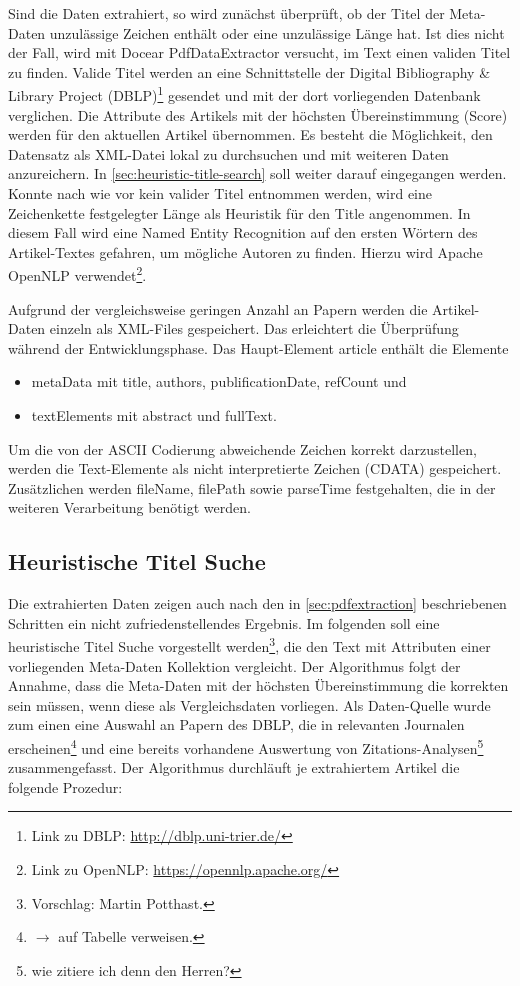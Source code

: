 Sind die Daten extrahiert, so wird zunächst überprüft, ob der Titel der
Meta-Daten unzulässige Zeichen enthält oder eine unzulässige Länge
hat. Ist dies nicht der Fall, wird mit Docear PdfDataExtractor
versucht, im Text einen validen Titel zu finden. Valide Titel
werden an eine Schnittstelle der Digital Bibliography \& Library
Project (DBLP)\footnote{Link zu DBLP: \url{http://dblp.uni-trier.de/}}
gesendet und mit der dort vorliegenden Datenbank verglichen. Die Attribute des Artikels mit
der höchsten Übereinstimmung (Score) werden für den aktuellen
Artikel übernommen. Es besteht die Möglichkeit, den Datensatz als
XML-Datei lokal zu durchsuchen und mit weiteren Daten anzureichern.
In \autoref{sec:heuristic-title-search} soll weiter darauf
eingegangen werden.
Konnte nach wie vor kein valider Titel entnommen
werden, wird eine Zeichenkette festgelegter Länge als Heuristik für
den Title angenommen. In diesem Fall wird eine Named Entity
Recognition auf den ersten Wörtern des Artikel-Textes gefahren, um mögliche
Autoren zu finden. Hierzu wird Apache OpenNLP verwendet\footnote{Link zu
  OpenNLP: \url{https://opennlp.apache.org/}}.

Aufgrund der vergleichsweise geringen Anzahl an Papern werden die
Artikel-Daten einzeln als XML-Files gespeichert. Das erleichtert die
Überprüfung während der Entwicklungsphase. Das Haupt-Element
article enthält die Elemente 
\begin{itemize}
\item metaData mit title, authors, publificationDate, refCount und
\item textElements mit abstract und fullText. 
\end{itemize}

Um die von der ASCII Codierung abweichende Zeichen korrekt darzustellen,
werden die Text-Elemente  als nicht interpretierte Zeichen (CDATA) gespeichert.
Zusätzlichen werden fileName, filePath sowie parseTime festgehalten,
die in der weiteren Verarbeitung benötigt werden. 

\subsection{Heuristische Titel Suche}\label{sec:heuristic-title-search}

Die extrahierten Daten zeigen auch nach den in \autoref{sec:pdfextraction}
beschriebenen Schritten ein nicht zufriedenstellendes Ergebnis. Im folgenden soll eine heuristische
Titel Suche vorgestellt werden\footnote{Vorschlag: Martin Potthast.}, die den Text mit Attributen einer
vorliegenden Meta-Daten Kollektion vergleicht. Der Algorithmus
folgt der Annahme, dass die Meta-Daten mit der höchsten Übereinstimmung
die korrekten sein müssen, wenn diese als Vergleichsdaten
vorliegen. Als Daten-Quelle wurde zum einen eine Auswahl an Papern des DBLP, die in relevanten Journalen erscheinen\footnote{$\rightarrow$ auf
  Tabelle verweisen.} und eine bereits vorhandene Auswertung von
Zitations-Analysen\footnote{wie zitiere ich denn den Herren?}
zusammengefasst. Der Algorithmus durchläuft je extrahiertem 
Artikel die folgende Prozedur:

